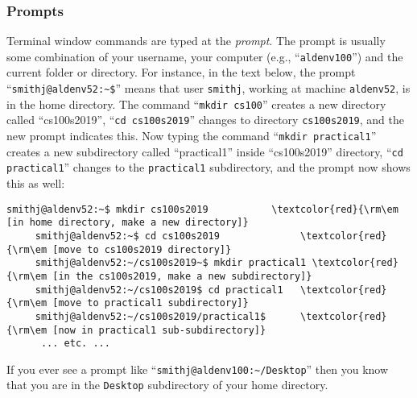 \subsubsection*{Prompts}
\vspace{-0.1in}
Terminal window commands are typed at 
the {\em prompt}. The prompt is usually some 
combination of your username, your computer (e.g., ``{\tt aldenv100}'')
and the current folder or directory. For instance, in the text below, 
the prompt ``\verb#smithj@aldenv52:~$#'' means that user {\tt smithj},
working at machine {\tt aldenv52}, is in the home directory.
The command ``{\tt mkdir cs100}'' creates a new directory called ``cs100s2019'', ``{\tt cd cs100s2019}'' changes to directory
{\tt cs100s2019}, and the new prompt indicates this. Now typing the command ``{\tt mkdir practical1}'' creates a new subdirectory called ``practical1'' inside ``cs100s2019'' directory, 
``{\tt cd practical1}'' changes to the {\tt practical1} subdirectory, and the prompt now
shows this as well:
\vspace{-0.1in}
\begin{Verbatim}[commandchars=\\\{\}]
     smithj@aldenv52:~$ mkdir cs100s2019           \textcolor{red}{\rm\em [in home directory, make a new directory]}
     smithj@aldenv52:~$ cd cs100s2019              \textcolor{red}{\rm\em [move to cs100s2019 directory]}
     smithj@aldenv52:~/cs100s2019~$ mkdir practical1 \textcolor{red}{\rm\em [in the cs100s2019, make a new subdirectory]}
     smithj@aldenv52:~/cs100s2019$ cd practical1   \textcolor{red}{\rm\em [move to practical1 subdirectory]}
     smithj@aldenv52:~/cs100s2019/practical1$      \textcolor{red}{\rm\em [now in practical1 sub-subdirectory]}
      ... etc. ...
\end{Verbatim}
\vspace{-0.1in}
If you ever see a prompt like ``\verb$smithj@aldenv100:~/Desktop$'' then you
know that you are in the {\tt Desktop} subdirectory of your home directory.

\vspace{-0.2in}
